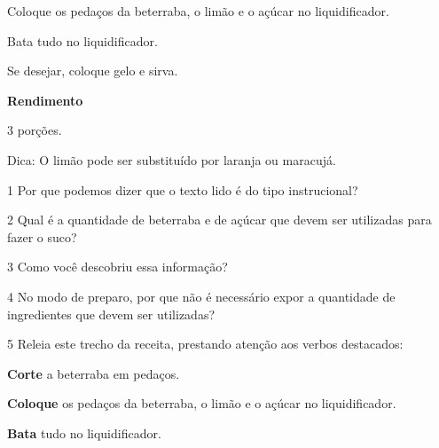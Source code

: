 \begin{conteudo}
\begin{conteudo}
\begin{conteudo}
\begin{myquote}
Coloque os pedaços da beterraba, o limão e o açúcar no liquidificador.

Bata tudo no liquidificador. 

Se desejar, coloque gelo e sirva.

\textbf{Rendimento}

3 porções.

Dica: O limão pode ser substituído por laranja ou maracujá.

\end{myquote}


\num{1} Por que podemos dizer que o texto lido é do tipo instrucional?


\num{2} Qual é a quantidade de beterraba e de açúcar que devem ser utilizadas
para fazer o suco?


\num{3} Como você descobriu essa informação?


\num{4} No modo de preparo, por que não é necessário expor a quantidade de
ingredientes que devem ser utilizadas?


\pagebreak
\num{5} Releia este trecho da receita, prestando atenção aos verbos destacados:

\begin{myquote}

\textbf{Corte} a beterraba em pedaços.

\textbf{Coloque} os pedaços da beterraba, o limão e o açúcar no liquidificador.

\textbf{Bata} tudo no liquidificador. 

\end{myquote}


\end{conteudo}
\end{conteudo}
\end{conteudo}
